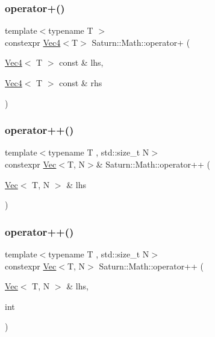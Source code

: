 \subsubsection{\texorpdfstring{operator+()}{operator+()}\hspace{0.1cm}{\footnotesize\ttfamily [4/4]}}
{\footnotesize\ttfamily template$<$typename T $>$ \\
constexpr \mbox{\hyperlink{namespace_saturn_1_1_math_a311b3d690ef397050af7963caa08d1bd}{Vec4}}$<$T$>$ Saturn\+::\+Math\+::operator+ (\begin{DoxyParamCaption}\item[{\mbox{\hyperlink{namespace_saturn_1_1_math_a311b3d690ef397050af7963caa08d1bd}{Vec4}}$<$ T $>$ const \&}]{lhs,  }\item[{\mbox{\hyperlink{namespace_saturn_1_1_math_a311b3d690ef397050af7963caa08d1bd}{Vec4}}$<$ T $>$ const \&}]{rhs }\end{DoxyParamCaption})}

\mbox{\label{namespace_saturn_1_1_math_a3a00dc10dd7f9474bb260f4f57d8f713}} 
\subsubsection{\texorpdfstring{operator++()}{operator++()}\hspace{0.1cm}{\footnotesize\ttfamily [1/2]}}
{\footnotesize\ttfamily template$<$typename T , std\+::size\+\_\+t N$>$ \\
constexpr \mbox{\hyperlink{class_saturn_1_1_math_1_1_vec}{Vec}}$<$T, N$>$\& Saturn\+::\+Math\+::operator++ (\begin{DoxyParamCaption}\item[{\mbox{\hyperlink{class_saturn_1_1_math_1_1_vec}{Vec}}$<$ T, N $>$ \&}]{lhs }\end{DoxyParamCaption})}

\mbox{\label{namespace_saturn_1_1_math_a3d83f17bba6c63db1e9df10ec5915133}} 
\subsubsection{\texorpdfstring{operator++()}{operator++()}\hspace{0.1cm}{\footnotesize\ttfamily [2/2]}}
{\footnotesize\ttfamily template$<$typename T , std\+::size\+\_\+t N$>$ \\
constexpr \mbox{\hyperlink{class_saturn_1_1_math_1_1_vec}{Vec}}$<$T, N$>$ Saturn\+::\+Math\+::operator++ (\begin{DoxyParamCaption}\item[{\mbox{\hyperlink{class_saturn_1_1_math_1_1_vec}{Vec}}$<$ T, N $>$ \&}]{lhs,  }\item[{int}]{ }\end{DoxyParamCaption})}

